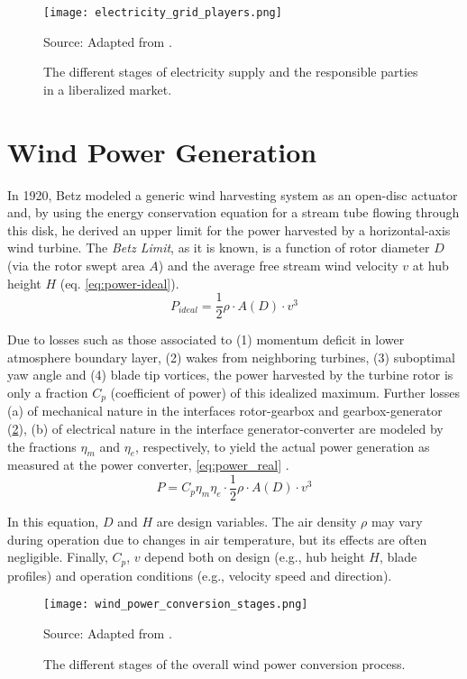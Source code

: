 \begin{figure}[H]%
   \centering
    \caption{The different stages of electricity supply and the responsible parties in a liberalized market.}
    \texttt{[image: electricity\_grid\_players.png]} \\
    \raggedright
    Source: Adapted from \cite{erbach2016market}.
   \label{fig:electricity_grid_players}
\end{figure}

\section{Wind Power Generation}

In 1920, Betz \cite{betz1920limit} modeled a generic wind harvesting system as an open-disc actuator and, by using the energy conservation equation for a stream tube flowing through this disk, he derived an upper limit for the power harvested by a horizontal-axis wind turbine. The \textit{Betz Limit}, as it is known, is a function of rotor diameter $D$ (via the rotor swept area $A$) and the average free stream wind velocity $v$ at hub height $H$ (eq. \ref{eq:power-ideal}).
\begin{equation}\label{eq:power-ideal}
P_{ideal} = \frac{1}{2}\rho \cdot A(D)\cdot v^3
\end{equation}

Due to losses such as those associated to (1) momentum deficit in lower atmosphere boundary layer, (2) wakes from neighboring turbines, (3) suboptimal yaw angle and (4) blade tip vortices, the power harvested by the turbine rotor is only a fraction $C_p$ (coefficient of power) of this idealized maximum. Further  losses (a) of mechanical nature in the interfaces rotor-gearbox and gearbox-generator (\ref{fig:wind_power_conversion_stages}), (b) of electrical nature in the interface generator-converter  are modeled by the fractions $\eta_{m}$ and $\eta_{e}$, respectively,  to yield the actual power generation as measured at the power converter, \ref{eq:power_real} \cite{albadi2009capacity}.
\begin{equation}\label{eq:power_real}
P = C_p\eta_{m} \eta_{e}  \cdot \frac{1}{2}\rho \cdot A(D)\cdot v^3
\end{equation}

In this equation, $D$ and $H$ are design variables. The air density $\rho$ may vary during operation due to changes in air temperature, but its effects are often negligible. Finally, $C_p$, $v$ depend both on design (e.g., hub height $H$, blade profiles) and operation conditions (e.g., velocity speed and direction).
\begin{figure}[H] %
   \centering
    \caption{ The different stages of the overall wind power conversion process. }
    \texttt{[image: wind\_power\_conversion\_stages.png]} \\
    \raggedright
    Source: Adapted from \cite{molina2011modelling}.
   \label{fig:wind_power_conversion_stages}
\end{figure}


